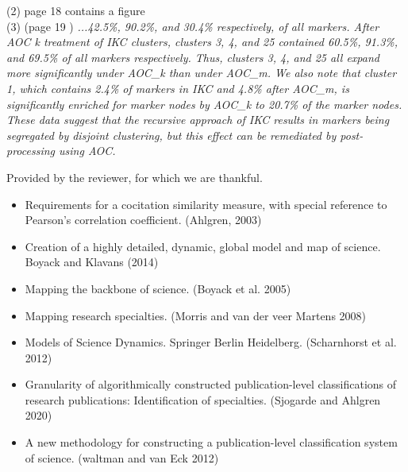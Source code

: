 \documentclass[11pt, oneside]{article}   	%
\begin{document}
(2) page 18 contains a figure\\

(3) (page 19 ) \emph{...42.5\%, 90.2\%, and 30.4\% respectively, of all markers. After AOC k treatment of IKC clusters, clusters 3, 4, and 25 contained 60.5\%, 91.3\%, and 69.5\% of all markers respectively. Thus, clusters 3, 4, and 25 all expand more significantly under AOC\_k than under AOC\_m. We also note that cluster 1, which contains 2.4\% of markers in IKC and 4.8\% after AOC\_m, is significantly enriched for marker nodes by AOC\_k to 20.7\% of the marker nodes. These data suggest that the recursive approach of IKC results in markers being segregated by disjoint clustering, but this effect can be remediated by post-processing using AOC.}


\vspace{4 mm}

Provided by the reviewer, for which we are thankful. 
\begin{itemize}
\item Requirements for a cocitation similarity measure, with special reference to Pearson’s correlation coefficient. (Ahlgren, 2003)
\item Creation of a highly detailed, dynamic, global model and map of science. Boyack and Klavans (2014)
\item Mapping the backbone of science. (Boyack et al. 2005) 
\item Mapping research specialties. (Morris and van der veer Martens 2008)
\item Models of Science Dynamics. Springer Berlin Heidelberg. (Scharnhorst et al. 2012)
\item Granularity of algorithmically constructed publication-level classifications of research publications: Identification of specialties. (Sjogarde and Ahlgren 2020)
\item A new methodology for constructing a publication-level classification system of science. (waltman and van Eck 2012)
\end{itemize}
\end{document}
